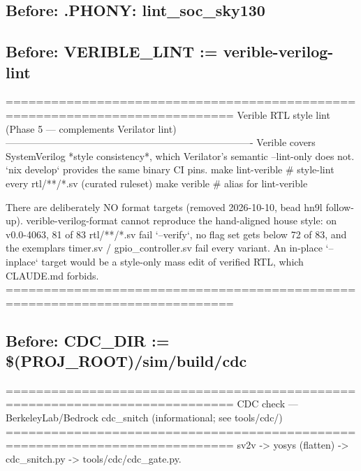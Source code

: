\begin{record}
\subsection*{Before: .PHONY: lint\_soc\_sky130}


\subsection*{Before: VERIBLE\_LINT    := verible-verilog-lint}

\begin{textblock}
============================================================================
Verible RTL style lint (Phase 5 — complements Verilator lint)
----------------------------------------------------------------------------
Verible covers SystemVerilog *style consistency*, which Verilator's semantic
--lint-only does not. `nix develop` provides the same binary CI pins.
  make lint-verible          # style-lint every rtl/**/*.sv (curated ruleset)
  make verible               # alias for lint-verible

There are deliberately NO format targets (removed 2026-10-10, bead hn9l
follow-up). verible-verilog-format cannot reproduce the hand-aligned house
style: on v0.0-4063, 81 of 83 rtl/**/*.sv fail `--verify`, no flag set gets
below 72 of 83, and the exemplars timer.sv / gpio_controller.sv fail every
variant. An in-place `--inplace` target would be a style-only mass edit of
verified RTL, which CLAUDE.md forbids.
============================================================================
\end{textblock}

\subsection*{Before: CDC\_DIR     := \$(PROJ\_ROOT)/sim/build/cdc}

\begin{textblock}
============================================================================
CDC check — BerkeleyLab/Bedrock cdc_snitch (informational; see tools/cdc/)
============================================================================
sv2v -> yosys (flatten) -> cdc_snitch.py -> tools/cdc/cdc_gate.py.


\end{textblock}
\end{record}
